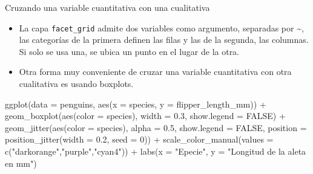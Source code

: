 \documentclass[
  ignorenonframetext,
  aspectratio=169]{beamer}
\newenvironment{Shaded}{\begin{snugshade}}{\end{snugshade}}
\newcommand{\AttributeTok}[1]{\textcolor[rgb]{0.77,0.63,0.00}{#1}}
\newcommand{\ConstantTok}[1]{\textcolor[rgb]{0.00,0.00,0.00}{#1}}
\newcommand{\DecValTok}[1]{\textcolor[rgb]{0.00,0.00,0.81}{#1}}
\newcommand{\FloatTok}[1]{\textcolor[rgb]{0.00,0.00,0.81}{#1}}
\newcommand{\FunctionTok}[1]{\textcolor[rgb]{0.00,0.00,0.00}{#1}}
\newcommand{\NormalTok}[1]{#1}
\newcommand{\SpecialCharTok}[1]{\textcolor[rgb]{0.00,0.00,0.00}{#1}}
\newcommand{\StringTok}[1]{\textcolor[rgb]{0.31,0.60,0.02}{#1}}
\begin{document}
\begin{frame}[fragile]{Cruzando una variable cuantitativa con una
cualitativa}
\protect\hypertarget{cruzando-una-variable-cuantitativa-con-una-cualitativa-3}{}
\begin{itemize}
\item
  La capa \texttt{facet\_grid} admite dos variables como argumento,
  separadas por \textasciitilde, las categorías de la primera definen
  las filas y las de la segunda, las columnas. Si solo se usa una, se
  ubica un punto en el lugar de la otra.
\item
  Otra forma muy conveniente de cruzar una variable cuantitativa con
  otra cualitativa es usando boxplots.
\end{itemize}

\begin{Shaded}
\begin{Highlighting}[]
\FunctionTok{ggplot}\NormalTok{(}\AttributeTok{data =}\NormalTok{ penguins, }\FunctionTok{aes}\NormalTok{(}\AttributeTok{x =}\NormalTok{ species, }\AttributeTok{y =}\NormalTok{ flipper\_length\_mm)) }\SpecialCharTok{+}
  \FunctionTok{geom\_boxplot}\NormalTok{(}\FunctionTok{aes}\NormalTok{(}\AttributeTok{color =}\NormalTok{ species), }\AttributeTok{width =} \FloatTok{0.3}\NormalTok{, }
               \AttributeTok{show.legend =} \ConstantTok{FALSE}\NormalTok{) }\SpecialCharTok{+} 
  \FunctionTok{geom\_jitter}\NormalTok{(}\FunctionTok{aes}\NormalTok{(}\AttributeTok{color =}\NormalTok{ species), }\AttributeTok{alpha =} \FloatTok{0.5}\NormalTok{, }
              \AttributeTok{show.legend =} \ConstantTok{FALSE}\NormalTok{, }
              \AttributeTok{position =} \FunctionTok{position\_jitter}\NormalTok{(}\AttributeTok{width =} \FloatTok{0.2}\NormalTok{, }\AttributeTok{seed =} \DecValTok{0}\NormalTok{)) }\SpecialCharTok{+}
  \FunctionTok{scale\_color\_manual}\NormalTok{(}\AttributeTok{values =} \FunctionTok{c}\NormalTok{(}\StringTok{"darkorange"}\NormalTok{,}\StringTok{"purple"}\NormalTok{,}\StringTok{"cyan4"}\NormalTok{)) }\SpecialCharTok{+}
  \FunctionTok{labs}\NormalTok{(}\AttributeTok{x =} \StringTok{"Epecie"}\NormalTok{, }\AttributeTok{y =} \StringTok{"Longitud de la aleta en mm"}\NormalTok{)}
\end{Highlighting}
\end{Shaded}
\end{frame}
\end{document}
